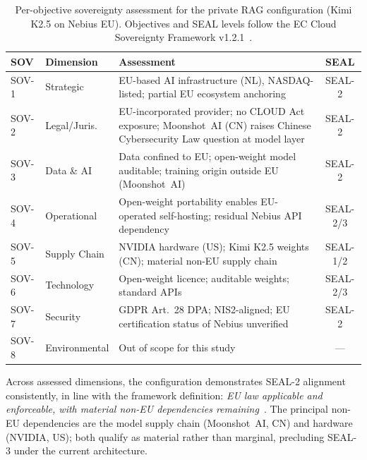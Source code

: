 \documentclass[runningheads]{llncs}
\begin{document}
\begin{table}[t]
\caption{Per-objective sovereignty assessment for the private RAG
  configuration (Kimi K2.5 on Nebius EU). Objectives and SEAL levels follow
  the EC Cloud Sovereignty Framework v1.2.1~\cite{ecseal2026}.}
\label{tab:sov}
\footnotesize
\begin{tabularx}{\linewidth}{@{} l l X c @{}}
\toprule
SOV & Dimension & Assessment & SEAL \\
\midrule
SOV-1 & Strategic        & EU-based AI infrastructure (NL), NASDAQ-listed;
                           partial EU ecosystem anchoring
                         & SEAL-2 \\
SOV-2 & Legal/Juris.\    & EU-incorporated provider; no CLOUD Act exposure;
                           Moonshot~AI (CN) raises Chinese Cybersecurity Law
                           question at model layer
                         & SEAL-2 \\
SOV-3 & Data \& AI       & Data confined to EU; open-weight model auditable;
                           training origin outside EU (Moonshot~AI)
                         & SEAL-2 \\
SOV-4 & Operational      & Open-weight portability enables EU-operated
                           self-hosting; residual Nebius API dependency
                         & SEAL-2/3 \\
SOV-5 & Supply Chain     & NVIDIA hardware (US); Kimi K2.5 weights (CN);
                           material non-EU supply chain
                         & SEAL-1/2 \\
SOV-6 & Technology       & Open-weight licence; auditable weights;
                           standard APIs
                         & SEAL-2/3 \\
SOV-7 & Security         & GDPR Art.~28 DPA; NIS2-aligned;
                           EU certification status of Nebius unverified
                         & SEAL-2 \\
SOV-8 & Environmental    & Out of scope for this study                      & --- \\
\bottomrule
\end{tabularx}
\end{table}

Across assessed dimensions, the configuration demonstrates SEAL-2 alignment
consistently, in line with the framework definition: \textit{EU law applicable and
enforceable, with material non-EU dependencies remaining}~\cite{ecseal2026}.
The principal non-EU dependencies are the model supply chain (Moonshot~AI,
CN) and hardware (NVIDIA, US); both qualify as material rather than marginal,
precluding SEAL-3 under the current architecture.
\end{document}

